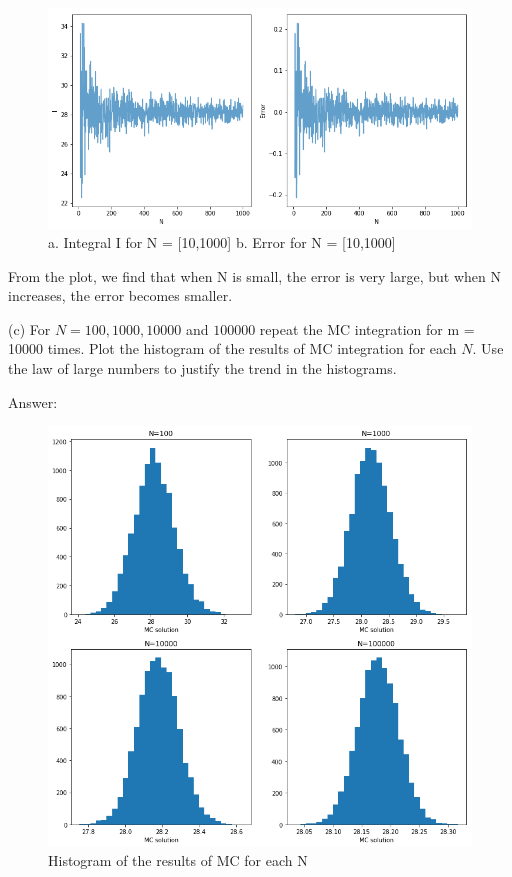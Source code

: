 \documentclass{article}
\begin{document}
\begin{figure}[ht]
\centering
\includegraphics[scale=0.5]{HW2_P4_b.png}
\caption{a. Integral I for N = [10,1000]
b. Error for N = [10,1000]}
\end{figure}

From the plot, we find that when N is small, the error is very large, but when N increases, the error becomes smaller.

\newpage
(c) For $N = 100, 1000, 10000$ and $100000$ repeat the MC integration for  m = 10000 times. Plot the histogram of the results of MC integration for each $N$. Use the law of large numbers to justify the trend in the histograms.

Answer:

\begin{figure}[ht]
\centering
\includegraphics[scale=0.5]{HW2_P4_c.png}
\caption{Histogram of the results of MC for each N}
\end{figure}
\end{document}
